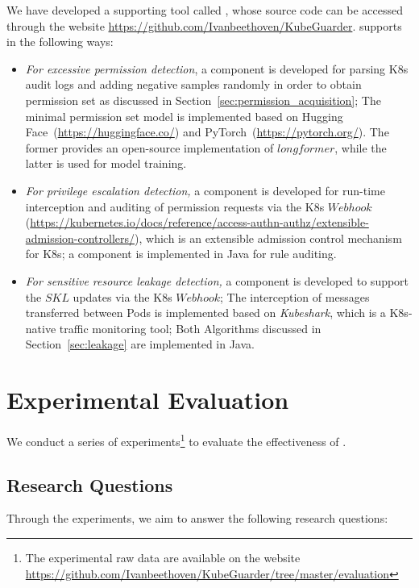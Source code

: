 \documentclass[conference]{IEEEtran}
\theoremstyle{definition}
\begin{document}
We have developed a supporting tool called \kger, whose source code can be accessed through the website  \url{https://github.com/Ivanbeethoven/KubeGuarder}. \kger supports \kg in the following ways:
\begin{itemize}
  \item \textit{For excessive permission detection}, a component is developed for parsing K8s audit logs and adding negative samples randomly in order to obtain permission set as discussed in Section~\ref{sec:permission_acquisition}; The minimal permission set model is implemented based on Hugging Face~({\url{https://huggingface.co/}}) and PyTorch~({\url{https://pytorch.org/}}). The former provides an open-source implementation of $longformer$, while the latter is used for model training. %
  
  \item \textit{For privilege escalation detection,} a component is developed for run-time interception and auditing of permission requests via the K8s $Webhook$ (\url{https://kubernetes.io/docs/reference/access-authn-authz/extensible-admission-controllers/}), which is an extensible admission control mechanism for K8s; a component is implemented in Java for rule auditing.

  \item \textit{For sensitive resource leakage detection,} a component is developed to support the $SKL$ updates via the K8s $Webhook$; The interception of messages transferred between Pods is implemented based on \textit{Kubeshark}, which is a K8s-native traffic monitoring tool; Both Algorithms discussed in Section~\ref{sec:leakage} are implemented in Java.
\end{itemize}

\section{Experimental Evaluation} 
\label{sec:ExperimentEvaluation}

We conduct a series of experiments\footnote{The experimental raw data are available on the website \url{https://github.com/Ivanbeethoven/KubeGuarder/tree/master/evaluation} } to evaluate the effectiveness of \kg. 

\subsection{Research Questions}
\label{ss:RQ}

Through the experiments, we aim to answer the following research questions:
\end{document}

